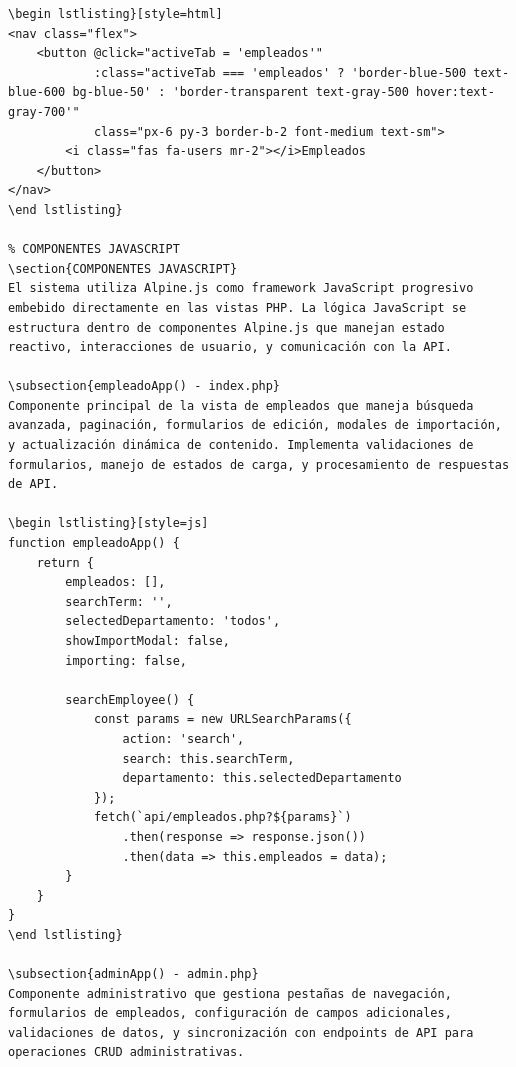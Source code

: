 \documentclass[12pt,a4paper]{article}
\begin{document}
\begin{lstlisting}[style=php]
\begin lstlisting}[style=html]
<nav class="flex">
    <button @click="activeTab = 'empleados'" 
            :class="activeTab === 'empleados' ? 'border-blue-500 text-blue-600 bg-blue-50' : 'border-transparent text-gray-500 hover:text-gray-700'"
            class="px-6 py-3 border-b-2 font-medium text-sm">
        <i class="fas fa-users mr-2"></i>Empleados
    </button>
</nav>
\end lstlisting}

% COMPONENTES JAVASCRIPT
\section{COMPONENTES JAVASCRIPT}
El sistema utiliza Alpine.js como framework JavaScript progresivo embebido directamente en las vistas PHP. La lógica JavaScript se estructura dentro de componentes Alpine.js que manejan estado reactivo, interacciones de usuario, y comunicación con la API.

\subsection{empleadoApp() - index.php}
Componente principal de la vista de empleados que maneja búsqueda avanzada, paginación, formularios de edición, modales de importación, y actualización dinámica de contenido. Implementa validaciones de formularios, manejo de estados de carga, y procesamiento de respuestas de API.

\begin lstlisting}[style=js]
function empleadoApp() {
    return {
        empleados: [],
        searchTerm: '',
        selectedDepartamento: 'todos',
        showImportModal: false,
        importing: false,
        
        searchEmployee() {
            const params = new URLSearchParams({
                action: 'search',
                search: this.searchTerm,
                departamento: this.selectedDepartamento
            });
            fetch(`api/empleados.php?${params}`)
                .then(response => response.json())
                .then(data => this.empleados = data);
        }
    }
}
\end lstlisting}

\subsection{adminApp() - admin.php}
Componente administrativo que gestiona pestañas de navegación, formularios de empleados, configuración de campos adicionales, validaciones de datos, y sincronización con endpoints de API para operaciones CRUD administrativas.


\end{lstlisting}
\end{document}
